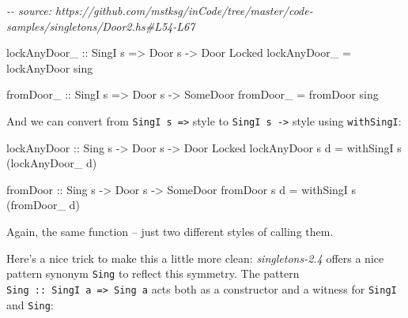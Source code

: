 \documentclass[]{article}
\newenvironment{Shaded}{}{}
\newcommand{\CommentTok}[1]{\textcolor[rgb]{0.38,0.63,0.69}{\textit{#1}}}
\newcommand{\DataTypeTok}[1]{\textcolor[rgb]{0.56,0.13,0.00}{#1}}
\newcommand{\NormalTok}[1]{#1}
\newcommand{\OtherTok}[1]{\textcolor[rgb]{0.00,0.44,0.13}{#1}}
\begin{document}
\begin{Shaded}
\begin{Highlighting}[]
\CommentTok{{-}{-} source: https://github.com/mstksg/inCode/tree/master/code{-}samples/singletons/Door2.hs\#L54{-}L67}

\OtherTok{lockAnyDoor\_ ::} \DataTypeTok{SingI}\NormalTok{ s }\OtherTok{=>} \DataTypeTok{Door}\NormalTok{ s }\OtherTok{{-}>} \DataTypeTok{Door} \DataTypeTok{\textquotesingle{}Locked}
\NormalTok{lockAnyDoor\_ }\OtherTok{=}\NormalTok{ lockAnyDoor sing}

\OtherTok{fromDoor\_ ::} \DataTypeTok{SingI}\NormalTok{ s }\OtherTok{=>} \DataTypeTok{Door}\NormalTok{ s }\OtherTok{{-}>} \DataTypeTok{SomeDoor}
\NormalTok{fromDoor\_ }\OtherTok{=}\NormalTok{ fromDoor sing}
\end{Highlighting}
\end{Shaded}

And we can convert from \texttt{SingI\ s\ =\textgreater{}} style to
\texttt{SingI\ s\ -\textgreater{}} style using \texttt{withSingI}:

\begin{Shaded}
\begin{Highlighting}[]
\OtherTok{lockAnyDoor ::} \DataTypeTok{Sing}\NormalTok{ s }\OtherTok{{-}>} \DataTypeTok{Door}\NormalTok{ s }\OtherTok{{-}>} \DataTypeTok{Door} \DataTypeTok{\textquotesingle{}Locked}
\NormalTok{lockAnyDoor s d }\OtherTok{=}\NormalTok{ withSingI s (lockAnyDoor\_ d)}

\OtherTok{fromDoor ::} \DataTypeTok{Sing}\NormalTok{ s }\OtherTok{{-}>} \DataTypeTok{Door}\NormalTok{ s }\OtherTok{{-}>} \DataTypeTok{SomeDoor}
\NormalTok{fromDoor s d }\OtherTok{=}\NormalTok{ withSingI s (fromDoor\_ d)}
\end{Highlighting}
\end{Shaded}

Again, the same function -- just two different styles of calling them.

Here's a nice trick to make this a little more clean: \emph{singletons-2.4}
offers a nice pattern synonym \texttt{Sing} to reflect this symmetry. The
pattern \texttt{Sing\ ::\ SingI\ a\ =\textgreater{}\ Sing\ a} acts both as a
constructor and a witness for \texttt{SingI} and \texttt{Sing}:
\end{document}
